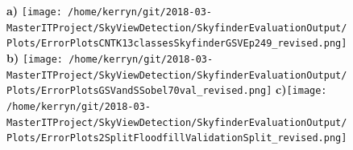 \documentclass{article}
\begin{document}
\begin{figure}
\centering
\textbf{\scriptsize{a)}}
\texttt{[image: /home/kerryn/git/2018-03-MasterITProject/SkyViewDetection/SkyfinderEvaluationOutput/Plots/ErrorPlotsCNTK13classesSkyfinderGSVEp249\_revised.png]}
\textbf{\scriptsize{b)}}
\texttt{[image: /home/kerryn/git/2018-03-MasterITProject/SkyViewDetection/SkyfinderEvaluationOutput/Plots/ErrorPlotsGSVandSSobel70val\_revised.png]}
\textbf{\scriptsize{c)}}\texttt{[image: /home/kerryn/git/2018-03-MasterITProject/SkyViewDetection/SkyfinderEvaluationOutput/Plots/ErrorPlots2SplitFloodfillValidationSplit\_revised.png]}
\end{figure}

\clearpage %
\end{document}
